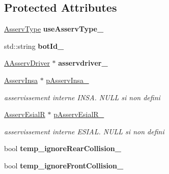 \subsection*{Protected Attributes}
\begin{DoxyCompactItemize}
\item 
\mbox{\label{classAsserv_ac43af40b4e29496836b89347be6d3d82}} 
\hyperlink{classAsserv_ad1cfde496b9ab7fb2cf6fa0d2cf6d8fc}{Asserv\+Type} {\bfseries use\+Asserv\+Type\+\_\+}
\item 
\mbox{\label{classAsserv_a949edfe11257727c44be6d50a36d7bb4}} 
std\+::string {\bfseries bot\+Id\+\_\+}
\item 
\mbox{\label{classAsserv_a9340e39c1e9d3623a91b1a980f782f22}} 
\hyperlink{classAAsservDriver}{A\+Asserv\+Driver} $\ast$ {\bfseries asservdriver\+\_\+}
\item 
\mbox{\label{classAsserv_a5bb8af2ccc5b327e2f88cabfe68a2896}} 
\hyperlink{classAsservInsa}{Asserv\+Insa} $\ast$ \hyperlink{classAsserv_a5bb8af2ccc5b327e2f88cabfe68a2896}{p\+Asserv\+Insa\+\_\+}
\begin{DoxyCompactList}\small\item\em asservissement interne I\+N\+SA. N\+U\+LL si non defini \end{DoxyCompactList}\item 
\mbox{\label{classAsserv_aeff82af864e0cbaa8c29654091900fae}} 
\hyperlink{classAsservEsialR}{Asserv\+EsialR} $\ast$ \hyperlink{classAsserv_aeff82af864e0cbaa8c29654091900fae}{p\+Asserv\+Esial\+R\+\_\+}
\begin{DoxyCompactList}\small\item\em asservissement interne E\+S\+I\+AL. N\+U\+LL si non defini \end{DoxyCompactList}\item 
\mbox{\label{classAsserv_a4c740e7b6601383705cdb14d8261956b}} 
bool {\bfseries temp\+\_\+ignore\+Rear\+Collision\+\_\+}
\item 
\mbox{\label{classAsserv_a738bfd2b93f33eee32256c0865fc9cc6}} 
bool {\bfseries temp\+\_\+ignore\+Front\+Collision\+\_\+}
\item 
\mbox{\label{classAsserv_ac560584fe37b6933db7faa8d897d7a97}} 

\end{DoxyCompactItemize}
